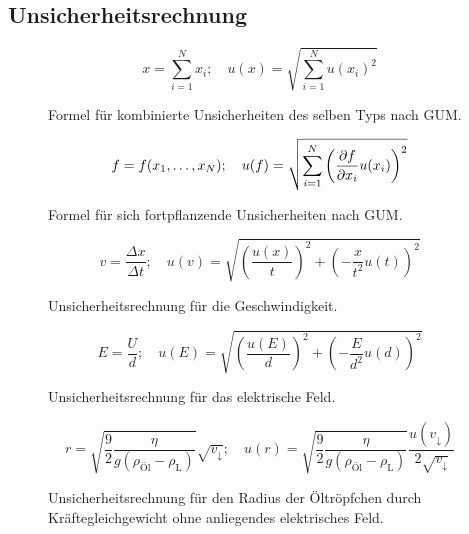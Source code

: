 \subsection{Unsicherheitsrechnung}\label{VGuD}

\begin{figure}[h]
	\begin{equation*}
		x = \sum_{i=1}^{N} x_i
		;\quad
		u(x) = \sqrt{\sum_{i = 1}^{N} u(x_i)^2}
	\end{equation*}
	\caption{Formel für kombinierte Unsicherheiten des selben Typs nach GUM.}
	\label{eq:GUM_combine}
\end{figure}

\begin{figure}[h]
	\begin{equation*}
		f = f(x_1, \dots , x_N)
		;\quad
		u(f) = \sqrt{\sum_{i = 1}^{N}\left(\pdv{f}{x_i} u(x_i)\right) ^2}
	\end{equation*}
	\caption{Formel für sich fortpflanzende Unsicherheiten nach GUM.}
	\label{eq:GUM_formula}
\end{figure}

\begin{figure}[h]
	\begin{equation*}
		v = \frac{\Delta x}{\Delta t}
		;\quad
		u(v) = \sqrt{\left( \frac{u(x)}{t} \right)^2 + \left( -\frac{x}{t^2} u(t) \right)^2}
	\end{equation*}
	\caption{Unsicherheitsrechnung für die Geschwindigkeit.}
	\label{eq:unc_v}
\end{figure}

\begin{figure}[h]
	\begin{equation*}
		E = \frac{U}{d}
		;\quad
		u(E) = \sqrt{\left( \frac{u(E)}{d} \right)^2 + \left( -\frac{E}{d^2} u(d) \right)^2}
	\end{equation*}
	\caption{Unsicherheitsrechnung für das elektrische Feld.}
	\label{eq:unc_E}
\end{figure}

\begin{figure}[h]
	\begin{equation*}
		r = \sqrt{\frac{9}{2} \frac{\eta}{g(\rho_\text{Öl}-\rho_\text{L})}} \sqrt{v_\downarrow}
		;\quad
		u(r) = \sqrt{\frac{9}{2} \frac{\eta}{g(\rho_\text{Öl}-\rho_\text{L})}} \frac{u(v_\downarrow)}{2\sqrt{v_\downarrow}}
	\end{equation*}
	\caption{Unsicherheitsrechnung für den Radius der Öltröpfchen durch Kräftegleichgewicht ohne anliegendes elektrisches Feld.}
	\label{eq:unc_r}
\end{figure}

